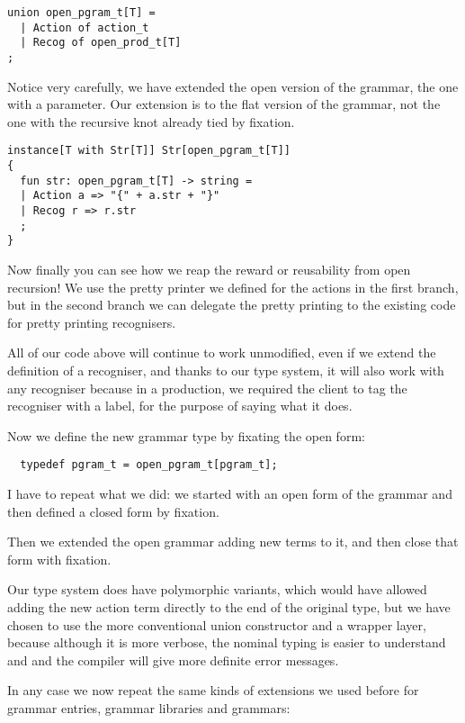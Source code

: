 \documentclass[oneside]{book}
\begin{document}
\begin{verbatim}
union open_pgram_t[T] = 
  | Action of action_t
  | Recog of open_prod_t[T]
;
\end{verbatim}

Notice very carefully, we have extended the open version
of the grammar, the one with a parameter. Our extension
is to the flat version of the grammar, not the one with
the recursive knot already tied by fixation.

\begin{verbatim}
instance[T with Str[T]] Str[open_pgram_t[T]] 
{
  fun str: open_pgram_t[T] -> string =
  | Action a => "{" + a.str + "}"
  | Recog r => r.str
  ;
}
\end{verbatim}

Now finally you can see how we reap the reward or
reusability from open recursion! We use the pretty
printer we defined for the actions in the first branch,
but in the second branch we can delegate the pretty
printing to the existing code for pretty printing
recognisers.

All of our code above will continue to work unmodified,
even if we extend the definition of a recogniser,
and thanks to our type system, it will also work
with any recogniser because in a production, we required
the client to tag the recogniser with a label, for
the purpose of saying what it does.

Now we define the new grammar type by fixating the
open form:
    
\begin{verbatim}
  typedef pgram_t = open_pgram_t[pgram_t];
\end{verbatim}

I have to repeat what we did: we started with an open form
of the grammar and then defined a closed form by fixation.

Then we extended the open grammar adding new terms to it,
and then close that form with fixation. 

Our type system does have polymorphic variants, which would
have allowed adding the new action term directly to the
end of the original type, but we have chosen to use the
more conventional union constructor and a wrapper
layer, because although it is more verbose, the nominal
typing is easier to understand and and the compiler will
give more definite error messages.

In any case we now repeat the same kinds of extensions
we used before for grammar entries, grammar libraries
and grammars:
\end{document}
